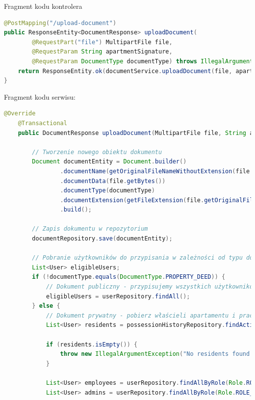 Fragment kodu kontrolera
\begin{lstlisting}[language=Java, caption=Fragment klasy \texttt{DocumentController}]
@PostMapping("/upload-document")
public ResponseEntity<DocumentResponse> uploadDocument(
        @RequestPart("file") MultipartFile file,
        @RequestParam String apartmentSignature,
        @RequestParam DocumentType documentType) throws IllegalArgumentException, IOException {
    return ResponseEntity.ok(documentService.uploadDocument(file, apartmentSignature, documentType));
}
\end{lstlisting}

Fragment kodu serwisu:
\begin{lstlisting}[language=Java, caption=Metoda dodawania dokumentu w klasie \texttt{DocumentServiceImp}]
		@Override
    @Transactional
    public DocumentResponse uploadDocument(MultipartFile file, String apartmentSignature, DocumentType documentType) throws IllegalArgumentException, IOException {

        // Tworzenie nowego obiektu dokumentu
        Document documentEntity = Document.builder()
                .documentName(getOriginalFileNameWithoutExtension(file.getOriginalFilename()))
                .documentData(file.getBytes())
                .documentType(documentType)
                .documentExtension(getFileExtension(file.getOriginalFilename()))
                .build();

        // Zapis dokumentu w repozytorium
        documentRepository.save(documentEntity);

        // Pobranie użytkowników do przypisania w zależności od typu dokumentu
        List<User> eligibleUsers;
        if (!documentType.equals(DocumentType.PROPERTY_DEED)) {
            // Dokument publiczny - przypisujemy wszystkich użytkowników
            eligibleUsers = userRepository.findAll();
        } else {
            // Dokument prywatny - pobierz właścieli apartamentu i pracowników oraz adminów
            List<User> residents = possessionHistoryRepository.findActiveResidentsByApartment(apartmentSignature);

            if (residents.isEmpty()) {
                throw new IllegalArgumentException("No residents found in apartment with signature: " + apartmentSignature);
            }

            List<User> employees = userRepository.findAllByRole(Role.ROLE_EMPLOYEE);
            List<User> admins = userRepository.findAllByRole(Role.ROLE_ADMIN);


\end{lstlisting}
